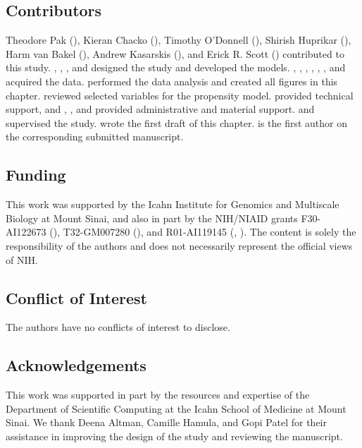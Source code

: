 \subsection*{Contributors}

Theodore Pak (), Kieran Chacko (), Timothy O'Donnell (), Shirish Huprikar (), Harm van Bakel (), Andrew Kasarskis (), and Erick R. Scott () contributed to this study. , , , and  designed the study and developed the models. , , , , , , and  acquired the data.  performed the data analysis and created all figures in this chapter.  reviewed selected variables for the propensity model.  provided technical support, and , , and  provided administrative and material support.  and  supervised the study.  wrote the first draft of this chapter.  is the first author on the corresponding submitted manuscript.

\subsection*{Funding}

This work was supported by the Icahn Institute for Genomics and Multiscale Biology at Mount Sinai, and also in part by the NIH/NIAID grants F30-AI122673 (), T32-GM007280 (), and R01-AI119145 (, ). The content is solely the responsibility of the authors and does not necessarily represent the official views of NIH.

\subsection*{Conflict of Interest}

The authors have no conflicts of interest to disclose.

\subsection*{Acknowledgements}

This work was supported in part by the resources and expertise of the Department of Scientific Computing at the Icahn School of Medicine at Mount Sinai. We thank Deena Altman, Camille Hamula, and Gopi Patel for their assistance in improving the design of the study and reviewing the manuscript.